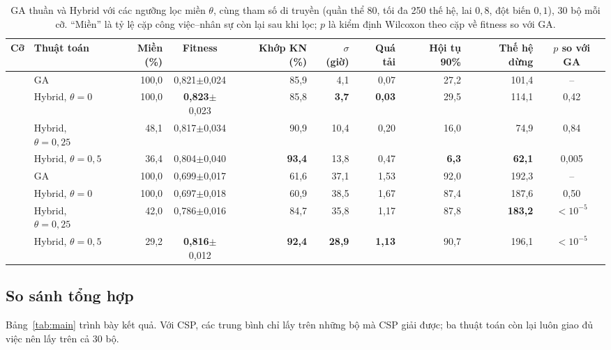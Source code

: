 \documentclass{IEEEtran}
\begin{document}
\begin{table}[!t]
\centering
\caption{GA thuần và Hybrid với các ngưỡng lọc miền $\theta$, cùng tham số di truyền (quần thể 80, tối đa 250 thế hệ, lai $0{,}8$, đột biến $0{,}1$), 30 bộ mỗi cỡ. ``Miền'' là tỷ lệ cặp công việc--nhân sự còn lại sau khi lọc; $p$ là kiểm định Wilcoxon theo cặp về fitness so với GA.}
\label{tab:theta}
\begin{tabular}{llrcrrrrrc}
\toprule
Cỡ & Thuật toán & Miền (\%) & Fitness & Khớp KN (\%) & $\sigma$ (giờ) & Quá tải & Hội tụ 90\% & Thế hệ dừng & $p$ so với GA \\
\midrule
{}
 & GA                 & 100,0 & 0,821$\pm$0,024 & 85,9 & 4,1 & 0,07 & 27,2 & 101,4 & -- \\
 & Hybrid, $\theta=0$    & 100,0 & \textbf{0,823}$\pm$0,023 & 85,8 & \textbf{3,7} & \textbf{0,03} & 29,5 & 114,1 & 0,42 \\
 & Hybrid, $\theta=0{,}25$ & 48,1 & 0,817$\pm$0,034 & 90,9 & 10,4 & 0,20 & 16,0 & 74,9 & 0,84 \\
 & Hybrid, $\theta=0{,}5$  & 36,4 & 0,804$\pm$0,040 & \textbf{93,4} & 13,8 & 0,47 & \textbf{6,3} & \textbf{62,1} & 0,005 \\
\midrule
{}
 & GA                 & 100,0 & 0,699$\pm$0,017 & 61,6 & 37,1 & 1,53 & 92,0 & 192,3 & -- \\
 & Hybrid, $\theta=0$    & 100,0 & 0,697$\pm$0,018 & 60,9 & 38,5 & 1,67 & 87,4 & 187,6 & 0,50 \\
 & Hybrid, $\theta=0{,}25$ & 42,0 & 0,786$\pm$0,016 & 84,7 & 35,8 & 1,17 & 87,8 & \textbf{183,2} & $<10^{-5}$ \\
 & Hybrid, $\theta=0{,}5$  & 29,2 & \textbf{0,816}$\pm$0,012 & \textbf{92,4} & \textbf{28,9} & \textbf{1,13} & 90,7 & 196,1 & $<10^{-5}$ \\
\bottomrule
\end{tabular}
\end{table}

\subsection{So sánh tổng hợp}

Bảng~\ref{tab:main} trình bày kết quả. Với CSP, các trung bình chỉ lấy trên những bộ mà CSP giải được; ba thuật toán còn lại luôn giao đủ việc nên lấy trên cả 30 bộ.
\end{document}
